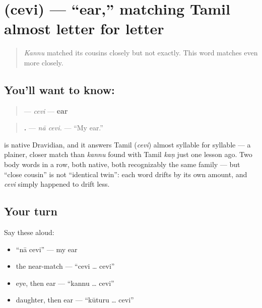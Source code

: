 \section[\texorpdfstring{\te{చెవి} (cevi)}{చెవి (cevi)}]{ (cevi) — \textquotedblleft{}ear,\textquotedblright{} matching Tamil almost letter for letter}

\label{lesson:TE-C37-cevi}



\begin{quote}
\emph{Kannu} matched its cousins closely but not exactly. This word matches even more closely.
\end{quote}

\subsection*{You'll want to know: }
\begin{quote}
\textbf{} — \emph{cevi} — \textbf{ear}
\end{quote}

\begin{quote}
\textbf{ .} — \emph{nā cevi.} — \textquotedblleft{}My ear.\textquotedblright{}
\end{quote}

\begin{cousinweb}
\textbf{} is native Dravidian, and it answers Tamil \textbf{} (\emph{cevi}) almost syllable for syllable — a plainer, closer match than \emph{kannu} found with Tamil \emph{kaṇ} just one lesson ago. Two body words in a row, both native, both recognizably the same family — but \textquotedblleft{}close cousin\textquotedblright{} is not \textquotedblleft{}identical twin\textquotedblright{}: each word drifts by its own amount, and \emph{cevi} simply happened to drift less.
\end{cousinweb}

\subsection*{Your turn}
Say these aloud:

\begin{itemize}
\raggedright
  \item \textquotedblleft{}nā cevi\textquotedblright{} — my ear
  \item the near-match — \textquotedblleft{}cevi … cevi\textquotedblright{}
  \item eye, then ear — \textquotedblleft{}kannu … cevi\textquotedblright{}
  \item daughter, then ear — \textquotedblleft{}kūturu … cevi\textquotedblright{}
\end{itemize}

